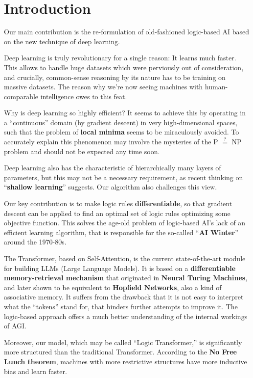 \chapter{Introduction}\label{chap:introduction}

Our main contribution is the re-formulation of old-fashioned logic-based AI based on the new technique of deep learning.

Deep learning is truly revolutionary for a single reason:  It learns much faster.  This allows to handle huge datasets which were perviously out of consideration, and crucially, common-sense reasoning by its nature has to be training on massive datasets.  The reason why we're now seeing machines with human-comparable intelligence owes to this feat.  

Why is deep learning so highly efficient?  It seems to achieve this by operating in a ``continuous'' domain (by gradient descent) in very high-dimensional spaces, such that the problem of \textbf{local minima} seems to be miraculously avoided.  To accurately explain this phenomenon may involve the mysteries of the P $\stackrel{?}{=}$ NP problem and should not be expected any time soon.

Deep learning also has the characteristic of hierarchically many layers of parameters, but this may not be a necessary requirement, as recent thinking on ``\textbf{shallow learning}'' suggests.  Our algorithm also challenges this view.

Our key contribution is to make logic rules \textbf{differentiable}, so that gradient descent can be applied to find an optimal set of logic rules optimizing some objective function.  This solves the age-old problem of logic-based AI's lack of an efficient learning algorithm, that is responsible for the so-called ``\textbf{AI Winter}'' around the 1970-80s.

The Transformer, based on Self-Attention, is the current state-of-the-art module for building LLMs (Large Language Models).  It is based on a \textbf{differentiable memory-retrieval mechanism} that originated in \textbf{Neural Turing Machines}, and later shown to be equivalent to \textbf{Hopfield Networks}, also a kind of associative memory.  It suffers from the drawback that it is not easy to interpret what the ``tokens'' stand for, that hinders further attempts to improve it.  The logic-based approach offers a much better understanding of the internal workings of AGI.

Moreover, our model, which may be called ``Logic Transformer,'' is significantly more structured than the traditional Transformer.  According to the \textbf{No Free Lunch theorem}, machines with more restrictive structures have more inductive bias and learn faster.

